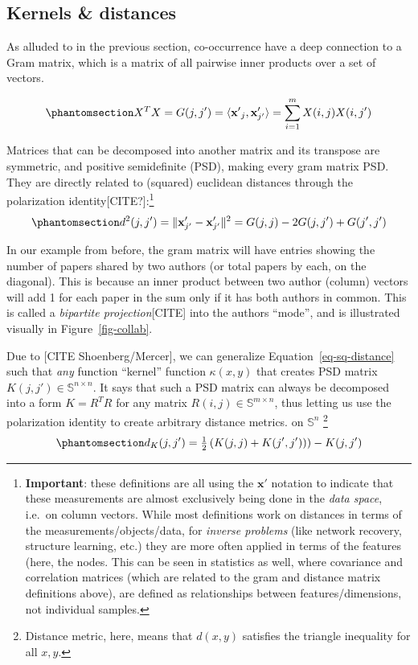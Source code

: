 \documentclass[%
	12pt,
		oneside,
		letterpaper
]{book}
\begin{document}
\subsection{Kernels \& distances}\label{kernels-distances}

As alluded to in the previous section, co-occurrence have a deep
connection to a Gram matrix, which is a matrix of all pairwise inner
products over a set of vectors.

\begin{equation}\phantomsection\label{eq-gram-mat}{
X^TX=G(j,j')=\langle\mathbf{x'}_j,\mathbf{x}_{j'}'\rangle = \sum_{i=1}^{m} X(i,j)X(i,j')
}\end{equation}

Matrices that can be decomposed into another matrix and its transpose
are symmetric, and positive semidefinite (PSD), making every gram matrix
PSD. They are directly related to (squared) euclidean distances through
the polarization identity{[}CITE?{]}:\footnote{\textbf{Important}: these
  definitions are all using the \(\mathbf{x}'\) notation to indicate
  that these measurements are almost exclusively being done in the
  \emph{data space}, i.e.~on column vectors. While most definitions work
  on distances in terms of the measurements/objects/data, for
  \emph{inverse problems} (like network recovery, structure learning,
  etc.) they are more often applied in terms of the features (here, the
  nodes. This can be seen in statistics as well, where covariance and
  correlation matrices (which are related to the gram and distance
  matrix definitions above), are defined as relationships between
  features/dimensions, not individual samples.}
\begin{equation}\phantomsection\label{eq-sq-distance}{
d^2(j,j') = \|\mathbf{x}_{j'}'-\mathbf{x}_{j'}'\|^2 = G(j,j) - 2G(j,j') + G(j',j') 
}\end{equation}

In our example from before, the gram matrix will have entries showing
the number of papers shared by two authors (or total papers by each, on
the diagonal). This is because an inner product between two author
(column) vectors will add 1 for each paper in the sum only if it has
both authors in common. This is called a \emph{bipartite
projection}{[}CITE{]} into the authors ``mode'', and is illustrated
visually in Figure~\ref{fig-collab}.

Due to {[}CITE Shoenberg/Mercer{]}, we can generalize
Equation~\ref{eq-sq-distance} such that \emph{any} function ``kernel''
function \(\kappa(x,y)\) that creates PSD matrix
\(K(j,j')\in\mathbb{S}^{n\times n}\). It says that such a PSD matrix can
always be decomposed into a form \(K=R^TR\) for any matrix
\(R(i,j)\in \mathbb{S}^{m\times n}\), thus letting us use the
polarization identity to create arbitrary distance metrics. on
\(\mathbb{S}^n\)
\autocite{SimilaritiesgraphsKernels_Avrachenkov2019}\footnote{ Distance
  metric, here, means that \(d(x,y)\) satisfies the triangle inequality
  for all \(x,y\).}
\begin{equation}\phantomsection\label{eq-dist-kernel}{
d_K(j,j') = \tfrac{1}{2}\left(K(j,j)+K(j',j'))\right)-K(j,j')
}\end{equation}
\end{document}

